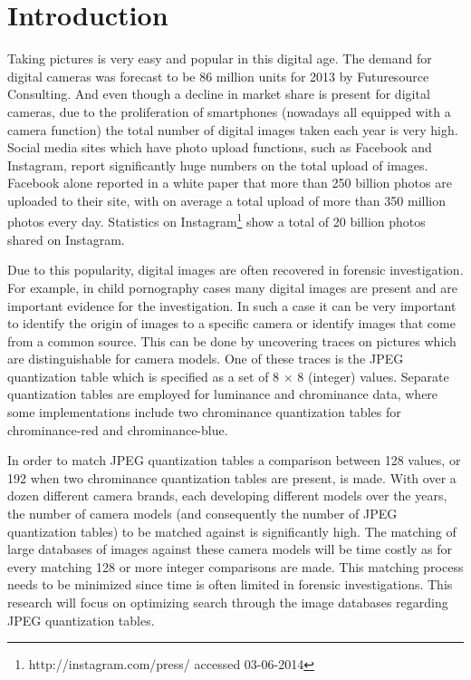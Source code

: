 \documentclass[a4paper,8pt]{article}
\begin{document}
\maketitle

\section*{Introduction}
Taking pictures is very easy and popular in this digital age. The demand for digital cameras was forecast to be 86 million units for 2013 by Futuresource Consulting\cite{futuresource}. And even though a decline in market share is present for digital cameras, due to the  proliferation of smartphones (nowadays all equipped with a camera function) the total number of digital images taken each year is very high. Social media sites which have photo upload functions, such as Facebook and Instagram, report significantly huge numbers on the total upload of images. Facebook alone reported in a white paper \cite{whitefacebook} that more than 250 billion photos are uploaded to their site, with on average a total upload of more than 350 million photos every day. Statistics on Instagram\footnote{http://instagram.com/press/ accessed 03-06-2014} show a total of 20 billion photos shared on Instagram.

Due to this popularity, digital images are often recovered in forensic investigation. For example, in child pornography cases many digital images are present and are important evidence for the investigation. In such a case it can be very important to identify the origin of images to a specific camera or identify images that come from a common source. This can be done by uncovering traces on pictures which are distinguishable for camera models. One of these traces is the JPEG quantization table which is specified as a set of 8 $\times$ 8 (integer) values. Separate quantization tables are employed for luminance and chrominance data, where some implementations include two chrominance quantization tables for chrominance-red and chrominance-blue. 

In order to match JPEG quantization tables a comparison between 128 values, or 192 when two chrominance quantization tables are present, is made. With over a dozen different camera brands, each developing different models over the years, the number of camera models (and consequently the number of JPEG quantization tables) to be matched against is significantly high. The matching of large databases of images against these camera models will be time costly as for every matching 128 or more integer comparisons are made. This matching process needs to be minimized since time is often limited in forensic investigations. This research will focus on optimizing search through the image databases regarding JPEG quantization tables.
\end{document}
